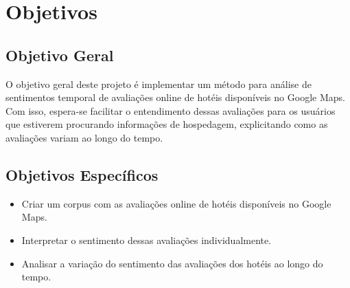 \chapter{Objetivos}

\label{cap:objetivos}

\section{Objetivo Geral}

O objetivo geral deste projeto é implementar um método para análise de sentimentos temporal de avaliações online de hotéis disponíveis no Google Maps. Com isso, espera-se facilitar o entendimento dessas avaliações para os usuários que estiverem procurando informações de hospedagem, explicitando como as avaliações variam ao longo do tempo.

\section{Objetivos Específicos}

\begin{itemize}
    \item Criar um corpus com as avaliações online de hotéis disponíveis no Google Maps.
    \item Interpretar o sentimento dessas avaliações individualmente.
    \item Analisar a variação do sentimento das avaliações dos hotéis ao longo do tempo.
\end{itemize}
